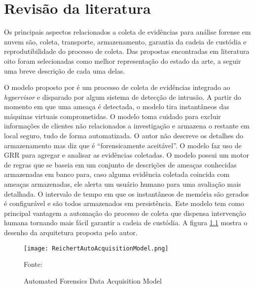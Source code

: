 \chapter{Revisão da literatura}
\label{chp:revisão}


Os principais aspectos relacionados a coleta de evidências para análise forense em nuvem são, coleta, transporte, armazenamento, garantia da cadeia de custódia e reprodutibilidade do processo de coleta. 
%
Das propostas encontradas em literatura oito foram selecionadas como melhor representação do estado da arte, a seguir uma breve descrição de cada uma delas.

%
O modelo proposto por \cite{ReichertAutoAcquisition:2015} é um processo de coleta de evidências integrado ao \textit{hypervisor} e disparado por algum sistema de detecção de intrusão. 
%
A partir do momento em que uma ameaça é detectada, o modelo tira instantâneos das máquinas virtuais comprometidas. O modelo toma cuidado para excluir informações de clientes não relacionados a investigação e armazena o restante em local seguro, tudo de forma automatizada.
%
O autor não descreve os detalhes do armazenamento mas diz que é ``forensicamente aceitável''.
%
O modelo faz uso de GRR para agregar e analisar as evidências coletadas. 
%
O modelo possui um motor de regras que se baseia em um conjunto de descrições de ameaças conhecidas armazenadas em banco para, caso alguma evidência coletada coincida com ameaças armazenadas, ele alerta um usuário humano para uma avaliação mais detalhada.
%
O intervalo de tempo em que os instantâneos de memória são gerados é configurável e são todos armazenados em persistência.
%
Este modelo tem como principal vantagem a automação do processo de coleta que dispensa intervenção humana tornando mais fácil garantir a cadeia de custódia. 
%
A figura \ref{fig:ReichertAutoAcquisitionModel} mostra o desenho da arquitetura proposta pelo autor.

\begin{figure}[htb!]
\footnotesize
\caption{Automated Forensics Data Acquisition Model}
\texttt{[image: ReichertAutoAcquisitionModel.png]}
\centering
\label{fig:ReichertAutoAcquisitionModel}
\begin{center}
Fonte: \cite{ReichertAutoAcquisition:2015} 
\end{center}
\end{figure}

